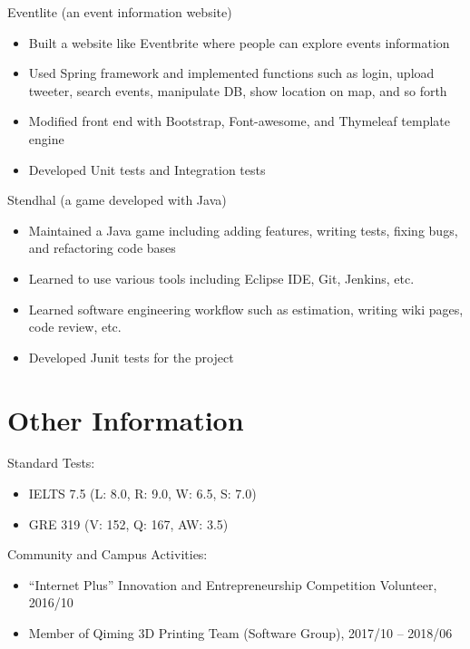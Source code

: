 \documentclass{resume}
\begin{document}
Eventlite (an event information website)
\begin{itemize}
    \item Built a website like Eventbrite where people can explore events information
    \item Used Spring framework and implemented functions such as login, upload tweeter, search events, manipulate DB, show location on map, and so forth
    \item Modified front end with Bootstrap, Font-awesome, and Thymeleaf template engine 
    \item Developed Unit tests and Integration tests
\end{itemize}


Stendhal (a game developed with Java)
\begin{itemize}
    \item Maintained a Java game including adding features, writing tests, fixing bugs, and refactoring code bases
    \item Learned to use various tools including Eclipse IDE, Git, Jenkins, etc.
    \item Learned software engineering workflow such as estimation, writing wiki pages, code review, etc.
    \item Developed Junit tests for the project
\end{itemize}

\section{Other Information}

Standard Tests:
\begin{itemize}
    \item IELTS 7.5 (L: 8.0, R: 9.0, W: 6.5, S: 7.0)
    \item GRE 319 (V: 152, Q: 167, AW: 3.5)
\end{itemize}

Community and Campus Activities: 
\begin{itemize}
    \item “Internet Plus” Innovation and Entrepreneurship Competition Volunteer, 2016/10
    \item Member of Qiming 3D Printing Team (Software Group), 2017/10 -- 2018/06
\end{itemize}
\end{document}
